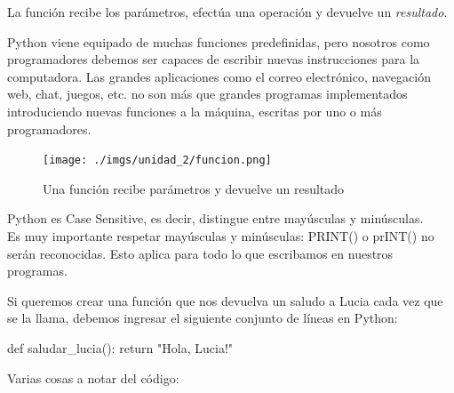\documentclass[
  letterpaper,
  DIV=11,
  numbers=noendperiod]{scrreprt}
\newenvironment{Shaded}{\begin{snugshade}}{\end{snugshade}}
\newcommand{\ControlFlowTok}[1]{\textcolor[rgb]{0.00,0.23,0.31}{#1}}
\newcommand{\KeywordTok}[1]{\textcolor[rgb]{0.00,0.23,0.31}{#1}}
\newcommand{\NormalTok}[1]{\textcolor[rgb]{0.00,0.23,0.31}{#1}}
\newcommand{\StringTok}[1]{\textcolor[rgb]{0.13,0.47,0.30}{#1}}
\begin{document}
La función recibe los parámetros, efectúa una operación y devuelve un
\emph{resultado}.

Python viene equipado de muchas funciones predefinidas, pero nosotros
como programadores debemos ser capaces de escribir nuevas instrucciones
para la computadora. Las grandes aplicaciones como el correo
electrónico, navegación web, chat, juegos, etc. no son más que grandes
programas implementados introduciendo nuevas funciones a la máquina,
escritas por uno o más programadores.

\begin{figure}[H]

{\centering \texttt{[image: ./imgs/unidad\_2/funcion.png]}

}

\caption{Una función recibe parámetros y devuelve un resultado}

\end{figure}%

\begin{tcolorbox}[enhanced jigsaw, bottomrule=.15mm, leftrule=.75mm, opacityback=0, colback=white, toprule=.15mm, bottomtitle=1mm, opacitybacktitle=0.6, rightrule=.15mm, left=2mm, arc=.35mm, coltitle=black, title=\textcolor{quarto-callout-note-color}{\faInfo}\hspace{0.5em}{Python es Case Sensitive}, breakable, toptitle=1mm, colframe=quarto-callout-note-color-frame, titlerule=0mm, colbacktitle=quarto-callout-note-color!10!white]

Python es Case Sensitive, es decir, distingue entre mayúsculas y
minúsculas.\\
Es muy importante respetar mayúsculas y minúsculas: PRINT() o prINT() no
serán reconocidas. Esto aplica para todo lo que escribamos en nuestros
programas.

\end{tcolorbox}

Si queremos crear una función que nos devuelva un saludo a Lucia cada
vez que se la llama, debemos ingresar el siguiente conjunto de líneas en
Python:

\begin{Shaded}
\begin{Highlighting}[]
\KeywordTok{def}\NormalTok{ saludar\_lucia():}
  \ControlFlowTok{return} \StringTok{"Hola, Lucia!"}
\end{Highlighting}
\end{Shaded}

Varias cosas a notar del código:
\end{document}
